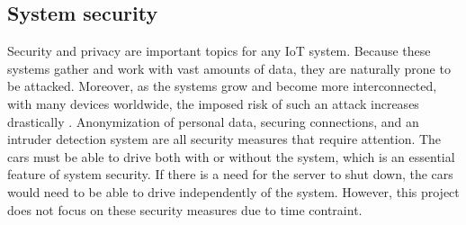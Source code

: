 \subsection{System security}
Security and privacy are important topics for any IoT system. Because these systems gather and work with vast amounts of data, they are naturally prone to be attacked. Moreover, as the systems grow and become more interconnected, with many devices worldwide, the imposed risk of such an attack increases drastically \parencite{iot_risk}. Anonymization of personal data, securing connections, and an intruder detection system are all security measures that require attention. The cars must be able to drive both with or without the system, which is an essential feature of system security. If there is a need for the server to shut down, the cars would need to be able to drive independently of the system. However, this project does not focus on these security measures due to time contraint. 